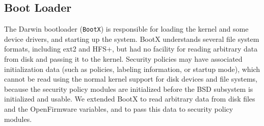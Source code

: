 \subsection{Boot Loader}

The Darwin bootloader ({\tt BootX}) is responsible for loading the
kernel and some device drivers, and starting up the system. BootX
understands several file system formats, including ext2 and HFS+,
but had no facility for reading arbitrary data from disk and passing
it to the kernel. Security policies may have associated initialization
data (such as policies, labeling information, or startup mode),
which cannot be read using the normal kernel support for disk devices
and file systems, because the security policy modules are initialized
before the BSD subsystem is initialized and usable.  We extended
BootX to read arbitrary data from disk files and the OpenFirmware
variables, and to pass this data to security policy modules.
